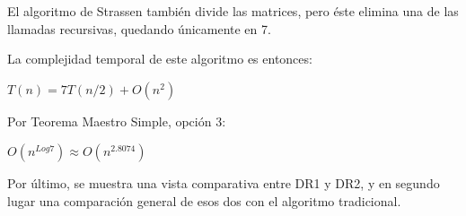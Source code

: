 \documentclass[12pt]{report}
\begin{document}
  El algoritmo de Strassen también divide las matrices, pero éste elimina una de las llamadas recursivas, quedando únicamente en 7.

  La complejidad temporal de este algoritmo es entonces:

  \begin{center}
      $ T(n) = 7T(n/2) +  O(n^2) $
  \end{center}


  Por Teorema Maestro Simple, opción 3:

  \begin{center}
    $ O(n^{Log7}) \approx O(n^{2.8074}) $
  \end{center}

  \centering

  Por último, se muestra una vista comparativa entre DR1 y DR2, y en segundo lugar una comparación general de esos dos con el algoritmo tradicional.

  \centering
\end{document}
